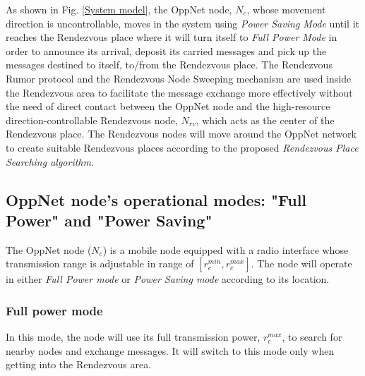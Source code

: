 \documentclass[conference]{IEEEtran}
\begin{document}
As shown in Fig. \ref{System model}, the OppNet node, $N_{c}$, whose movement direction is uncontrollable, moves in the system using \textit{Power Saving Mode}  until it reaches the Rendezvous place where it will turn itself to \emph{Full Power Mode} in order to announce its arrival, deposit its carried messages and pick up the messages destined to itself, to/from the Rendezvous place.
The Rendezvous Rumor protocol and the Rendezvous Node Sweeping mechanism are used inside the Rendezvous area to facilitate the message exchange more effectively without the need of direct contact between the OppNet node and the high-resource direction-controllable Rendezvous node, $N_{rv}$, which acts as the center of the Rendezvous place.
The Rendezvous nodes will move around the OppNet network to create suitable Rendezvous places according to the proposed \emph{Rendezvous Place Searching algorithm}.

\subsection{OppNet node's operational modes: "Full Power" and "Power Saving"}
The OppNet node ($N_{c}$) is a mobile node equipped with a radio interface whose transmission range is adjustable in range of $[{ r }_{ c }^{ min },{ r }_{ c }^{ max }]$.
The node will operate in either \emph{Full Power mode} or \emph{Power Saving mode} according to its location.

\subsubsection{Full power mode}

In this mode, the node will use its full transmission power, ${ r }_{ c }^{ max }$, to search for nearby nodes and exchange messages.
%
It will switch to this mode only when getting into the Rendezvous area.

\end{document}
